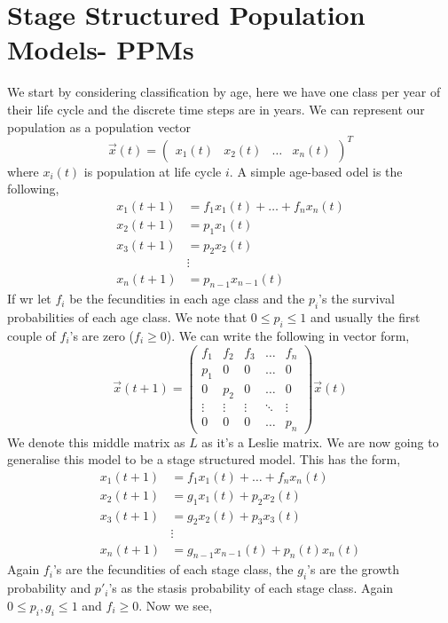 \section{Stage Structured Population Models- PPMs}
We start by considering classification by age, here we have one class per year of their life cycle and the discrete time steps are in years. We can represent our population as a population vector
$$ \vec x(t) = \begin{pmatrix}
  x_1(t) & x_2(t) & \dots & x_n(t)
\end{pmatrix}^T $$
where $x_i(t)$ is population at life cycle $i$. A simple age-based odel is the following,
\begin{align*}
  x_1(t+1) &= f_1x_1(t) + \dots + f_nx_n(t) \\
  x_2(t+1) &= p_1x_1(t) \\
  x_3(t+1) &= p_2x_2(t) \\
  & \vdots \\
  x_n(t+1) &= p_{n-1}x_{n-1}(t)
\end{align*}
If wr let $f_i$ be the fecundities in each age class and the $p_i$'s the survival probabilities of each age class. We note that $0 \le p_i \le 1$ and usually the first couple of $f_i$'s are zero ($f_i \ge 0$). We can write the following in vector form,
$$ \vec x(t+1) = \begin{pmatrix}
  f_1 & f_2 & f_3 & \dots & f_n \\
  p_1 & 0 & 0 & \dots & 0 \\
  0 & p_2 & 0 & \dots & 0 \\
  \vdots & \vdots & \vdots & \ddots & \vdots \\
  0 & 0 & 0 & \dots & p_n
\end{pmatrix} \vec x(t)$$
We denote this middle matrix as $L$ as it's a Leslie matrix. We are now going to generalise this model to be a stage structured model. This has the form,
\begin{align*}
  x_1(t+1) &= f_1x_1(t) + \dots + f_nx_n(t) \\
  x_2(t+1) &= g_1x_1(t) + p_2x_2(t) \\
  x_3(t+1) &= g_2x_2(t) + p_3x_3(t) \\
  & \vdots \\
  x_n(t+1) &= g_{n-1}x_{n-1}(t) + p_n(t)x_n(t)
\end{align*}
Again $f_i$'s are the fecundities of each stage class, the $g_i$'s are the growth probability and $p'_i$'s as the stasis probability of each stage class. Again $0 \le p_i, g_i \le 1$ and $f_i \ge 0$. Now we see,
